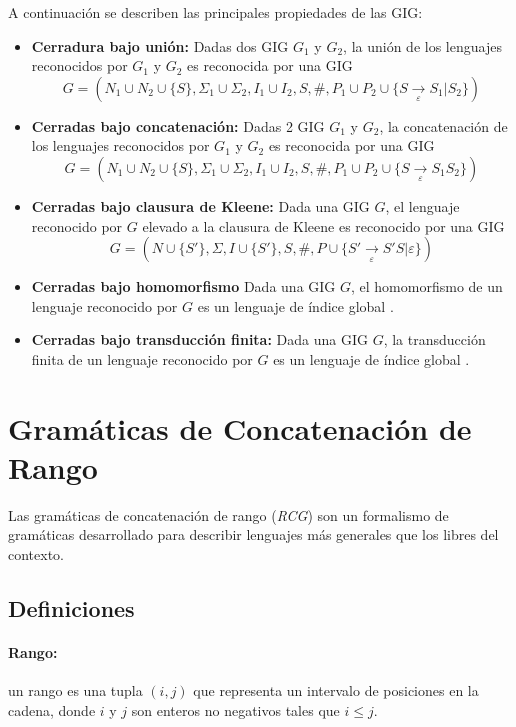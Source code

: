 \documentclass[12pt]{article}
\begin{document}
A continuación se describen las principales propiedades de las GIG:
\begin{itemize}
    \item \textbf{Cerradura bajo unión:} Dadas dos GIG $G_1$ y $G_2$, la unión de los lenguajes reconocidos por $G_1$ y $G_2$ es reconocida por una GIG
          $$G=(N_1\cup N_2\cup \{S\},\Sigma_1\cup \Sigma_2,I_1\cup I_2,S,\#,P_1\cup P_2\cup \{S \underset{\varepsilon}{\to} S_1|S_2\})$$
    \item \textbf{Cerradas bajo concatenación:} Dadas 2 GIG $G_1$ y $G_2$, la concatenación de los lenguajes reconocidos por $G_1$ y $G_2$ es reconocida por una GIG
          $$G=(N_1\cup N_2\cup \{S\},\Sigma_1\cup \Sigma_2,I_1\cup I_2,S,\#,P_1\cup P_2\cup \{S \underset{\varepsilon}{\to} S_1S_2\})$$
    \item \textbf{Cerradas bajo clausura de Kleene:} Dada una GIG $G$, el lenguaje reconocido por $G$ elevado a la clausura de Kleene es reconocido por una GIG
          $$G=(N\cup \{S'\},\Sigma,I\cup \{S'\},S,\#,P\cup \{S'\underset{\varepsilon}{\to} S'S|\varepsilon\})$$
    \item  \textbf{Cerradas bajo homomorfismo} Dada una GIG $G$, el homomorfismo de un lenguaje reconocido por $G$ es un lenguaje de índice global \cite{globalIndexLanguages}.
    \item  \textbf{Cerradas bajo transducción finita:} Dada una GIG $G$, la transducción finita de un lenguaje reconocido por $G$ es un lenguaje de índice global \cite{globalIndexLanguages}.
\end{itemize}

\section{Gramáticas de Concatenación de Rango}

Las gramáticas de concatenación de rango (\textit{RCG}) \cite{mainRCGBib} son un formalismo de gramáticas desarrollado
para describir lenguajes más generales que los libres del contexto.

\subsection{Definiciones}

\paragraph{Rango:} un rango es una tupla $(i, j)$ que representa un intervalo de posiciones en la cadena, donde $i$ y $j$ son enteros no negativos tales que $i \leq j$.
\end{document}
